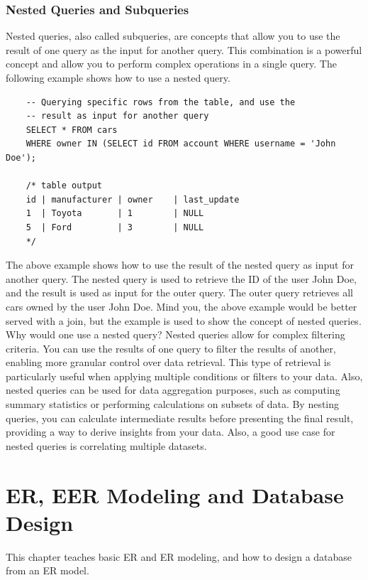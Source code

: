 \subsection{Nested Queries and Subqueries}
Nested queries, also called subqueries, are concepts that allow you to use the result of one query as the input for another query. This combination is a powerful concept and allow you to perform complex operations in a single query. The following example shows how to use a nested query.

\begin{verbatim}
    -- Querying specific rows from the table, and use the 
    -- result as input for another query
    SELECT * FROM cars
    WHERE owner IN (SELECT id FROM account WHERE username = 'John Doe');

    /* table output
    id | manufacturer | owner    | last_update
    1  | Toyota       | 1        | NULL
    5  | Ford         | 3        | NULL
    */
\end{verbatim}

The above example shows how to use the result of the nested query as input for another query. The nested query is used to retrieve the ID of the user John Doe, and the result is used as input for the outer query. The outer query retrieves all cars owned by the user John Doe. Mind you, the above example would be better served with a join, but the example is used to show the concept of nested queries.
Why would one use a nested query? Nested queries allow for complex filtering criteria. You can use the results of one query to filter the results of another, enabling more granular control over data retrieval. This type of retrieval is particularly useful when applying multiple conditions or filters to your data. Also, nested queries can be used for data aggregation purposes, such as computing summary statistics or performing calculations on subsets of data. By nesting queries, you can calculate intermediate results before presenting the final result, providing a way to derive insights from your data. Also, a good use case for nested queries is correlating multiple datasets.

\chapter{ER, EER Modeling and Database Design}
\label{chap:relational:eer-modeling-and-database-design}
This chapter teaches basic ER and ER modeling, and how to design a database from an ER model.

